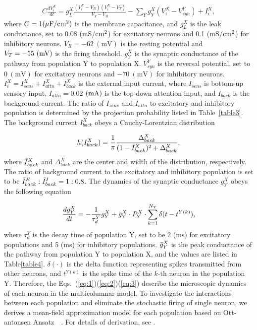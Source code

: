 \documentclass[10pt,letterpaper]{article}
\begin{document}
\begin{eqnarray}
\label{eq:1}
    C\frac{dV_{i}^{X}}{dt} = g_{L}^{X}\frac{(V_{i}^{X}-V_{R})(V_{i}^{X}-V_{T})}{V_{T}-V_{R}}-\sum_{Y}g_{Y}^{X}(V_{i}^{X}-V_{syn}^{Y}) + I_{i}^{X},
\end{eqnarray}
where $C=1(\rm \mu F/cm^2)$ is the membrane capacitance, and $g_{L}^{X}$ is the leak conductance, set to 0.08 (mS/$\rm cm^{2}$) for excitatory neurons and 0.1 (mS/$\rm cm^{2}$) for inhibitory neurons. $V_{R}=-62\ \mathrm{(mV)}$ is the resting potential and $V_{T}=-55\ (\rm mV)$ is the firing threshold. $g_{Y}^{X}$ is the synaptic conductance of the pathway from population Y to population X. $V_{syn}^{Y}$ is the reversal potential, set to  $0\ \mathrm{(mV)}$ for excitatory neurons and $-70\ \mathrm{(mV)}$ for inhibitory neurons. $I_{i}^{X}=I_{sens}^{X} + I_{attn}^{X} + I_{back}^{X}$ is the external input current, where $I_{sens}$ is bottom-up sensory input, $I_{attn}=0.02$ $(\rm mA)$ is the top-down attention input, and $I_{back}$ is the background current. The ratio of $I_{sens}$ and $I_{attn}$ to excitatory and inhibitory population is determined by the projection probability listed in Table~\ref{table3}. The background current $I_{back}^{X}$ obeys a Cauchy-Lorentzian distribution

\begin{eqnarray}
\label{eq:2}
        h(I_{back}^{X}) = \frac{1}{\pi}\frac{\Delta_{back}^{X}}{(1-\Bar{I}_{back}^{X})^{2}+\Delta_{back}^{X}},
\end{eqnarray}
where $\Bar{I}_{back}^{X}$ and $\Delta_{back}^{X}$ are the center and width of the distribution, respectively. The ratio of background current to the excitatory and inhibitory population is set to be $\Bar{I}_{back}^{E} : \Bar{I}_{back}^{I} = 1:0.8$. The dynamics of the synaptic conductance $g_{Y}^{X}$ obeys the following equation

\begin{eqnarray}
\label{eq:3}
    \frac{dg_{Y}^{X}}{dt} = -\frac{1}{\tau_{d}^{Y}}g_{Y}^{X}+\Bar{g}_{Y}^{X}\cdot P_{Y}^{X}\cdot\sum_{k=1}^{N_{Y}}\delta(t-t^{Y(k)}),
\end{eqnarray}
where $\tau_{d}^{Y}$ is the decay time of population Y, set to be 2 (ms) for excitatory populations and 5 (ms) for inhibitory populations. $\Bar{g}_{Y}^{X}$ is the peak conductance of the pathway from population Y to population X, and the values are listed in Table\ref{table4}. $\delta(\cdot)$ is the delta function representing spikes transmitted from other neurons, and $t^{Y(k)}$ is the spike time of the $k$-th neuron in the population Y. Therefore, the Eqs.~(\ref{eq:1})(\ref{eq:2})(\ref{eq:3}) describe the microscopic dynamics of each neuron in the multicolumnar model. To investigate the interactions between each population and eliminate the stochastic firing of single neuron, we derives a mean-field approximation model for each population based on Ott-antonsen Ansatz~\cite{ott2008}~\cite{montbrio2015}. For details of derivation, see .
\end{document}
